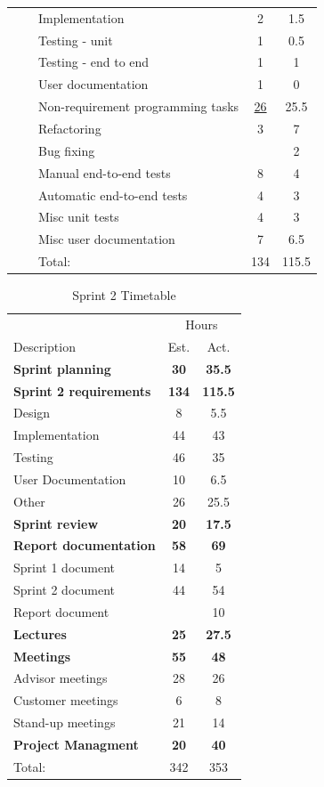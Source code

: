 \begin{table}[!htb]
\begin{tabularx}{\textwidth}{l l X c c}
	   &  & Implementation & 2 & 1.5 \\
	   &  & Testing - unit & 1 & 0.5 \\
	   &  & Testing - end to end & 1 & 1 \\
	   &  & User documentation & 1 & 0 \\
	\addlinespace
	14 &  & Non-requirement programming tasks & \underline{ 26 } & 25.5 \\
	   &  & Refactoring & 3 & 7 \\
	   &  & Bug fixing & & 2 \\
	   &  & Manual end-to-end tests & 8 & 4 \\
	   &  & Automatic end-to-end tests & 4 & 3 \\
	   &  & Misc unit tests & 4 & 3 \\
	   &  & Misc user documentation & 7 & 6.5 \\
	\midrule
	& & Total: & 134 & 115.5 \\
	\bottomrule
\end{tabularx}
\end{table}


\begin{table}[!htb] \small \center
\caption{Sprint 2 Timetable\label{tab:sprint2time}}
\begin{tabularx}{\textwidth}{X c c}
	\toprule
	& \multicolumn{2}{c}{Hours} \\
	\cmidrule(r){2-3}
	Description & Est. & Act. \\
	\midrule
	\textbf{Sprint planning} & \textbf{30} & \textbf{35.5} \\
	\addlinespace
	\textbf{Sprint 2 requirements} & \textbf{134} & \textbf{115.5} \\
	Design & 8 & 5.5 \\
	Implementation & 44 & 43 \\
	Testing & 46 & 35 \\
	User Documentation & 10 & 6.5 \\
	Other & 26 & 25.5 \\
	\addlinespace
	\textbf{Sprint review} & \textbf{20} & \textbf{17.5} \\
	\addlinespace
	\textbf{Report documentation} & \textbf{58} & \textbf{69} \\
	Sprint 1 document & 14 & 5 \\
	Sprint 2 document & 44 & 54 \\
	Report document & & 10 \\
	\addlinespace
	\textbf{Lectures} & \textbf{25} & \textbf{27.5} \\
	\addlinespace
	\textbf{Meetings} & \textbf{55} & \textbf{48} \\
	Advisor meetings & 28 & 26 \\
	Customer meetings & 6 & 8 \\
	Stand-up meetings & 21 & 14 \\
	\addlinespace
	\textbf{Project Managment} & \textbf{20} & \textbf{40} \\
	\midrule
	Total: & 342 & 353 \\
	\bottomrule
\end{tabularx}
\end{table}


